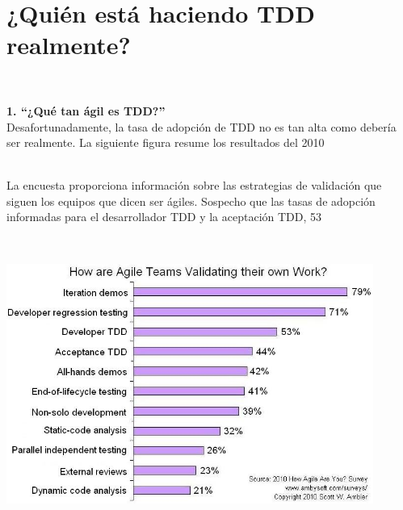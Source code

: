 \section{¿Quién está haciendo TDD realmente?} 
\textbf{}\\
\begin{flushleft}
\begin{center}	
\end{center}
\begin{itemize}
\textbf{1.	 “¿Qué tan ágil es TDD?” }
\textbf{}\\
Desafortunadamente, la tasa de adopción de TDD no es tan alta como debería ser realmente.  La siguiente figura resume los resultados del 2010


\textbf{}\\
 La encuesta proporciona información sobre las estrategias de validación que siguen los equipos que dicen ser ágiles. Sospecho que las tasas de adopción informadas para el desarrollador TDD y la aceptación TDD, 53%

\textbf{}\\

\begin{center}
    \includegraphics[width=12cm]{./Imagenes/test}
    \end{center}

\end{itemize} 







\end{flushleft}